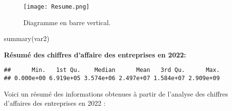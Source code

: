 \documentclass[mstat,12pt]{unswthesis}
\newenvironment{Shaded}{\begin{snugshade}}{\end{snugshade}}
\newcommand{\FunctionTok}[1]{\textcolor[rgb]{0.00,0.00,0.00}{#1}}
\newcommand{\NormalTok}[1]{#1}
\newcommand{\SpecialCharTok}[1]{\textcolor[rgb]{0.00,0.00,0.00}{#1}}
\begin{document}
\begin{figure}
\centering
\texttt{[image: Resume.png]}
\caption{Diagramme en barre vertical.}
\end{figure}

\begin{Shaded}
\begin{Highlighting}[]
\FunctionTok{summary}\NormalTok{(var2)}
\end{Highlighting}
\end{Shaded}

\textbf{Résumé des chiffres d'affaire des entreprises en 2022:}

\begin{Shaded}
\end{Shaded}

\begin{verbatim}
##      Min.   1st Qu.    Median      Mean   3rd Qu.      Max. 
## 0.000e+00 6.919e+05 3.574e+06 2.497e+07 1.584e+07 2.909e+09
\end{verbatim}

\medskip

Voici un résumé des informations obtenues à partir de l'analyse des
chiffres d'affaires des entreprises en 2022 :
\end{document}
